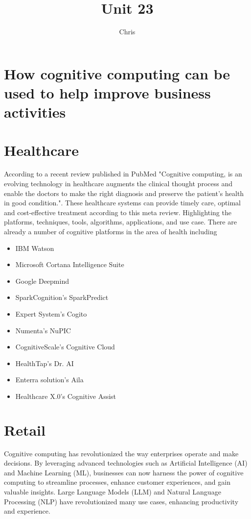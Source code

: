 \documentclass{article}
\title{Unit 23}
\author{Chris}
\date{}
\begin{document}
\section{How cognitive computing can be used to help improve business activities}

\section{Healthcare}
According to a recent review published in PubMed "Cognitive computing, is an evolving technology in healthcare augments the clinical thought process and enable the doctors to make the right diagnosis and preserve the patient's health in good condition."\cite{pubmed}. These healthcare systems can provide timely care, optimal and cost-effective treatment according to this meta review. Highlighting the platforms, techniques, tools, algorithms, applications, and use case. 
There are already a number of cognitive platforms in the area of health including
\begin{itemize}
    \item IBM Watson
    \item Microsoft Cortana Intelligence Suite
    \item Google Deepmind
    \item SparkCognition’s SparkPredict
    \item Expert System’s Cogito
    \item Numenta’s NuPIC
    \item CognitiveScale’s Cognitive Cloud
    \item HealthTap’s Dr. AI
    \item Enterra solution’s Aila
    \item Healthcare X.0’s Cognitive Assist
\end{itemize}



\section{Retail}
Cognitive computing has revolutionized the way enterprises operate and make decisions. By leveraging advanced technologies such as Artificial Intelligence (AI) and Machine Learning (ML), businesses can now harness the power of cognitive computing to streamline processes, enhance customer experiences, and gain valuable insights. Large Language Models (LLM) and Natural Language Processing (NLP) have revolutionized many use cases, enhancing productivity and experience. 
\end{document}
